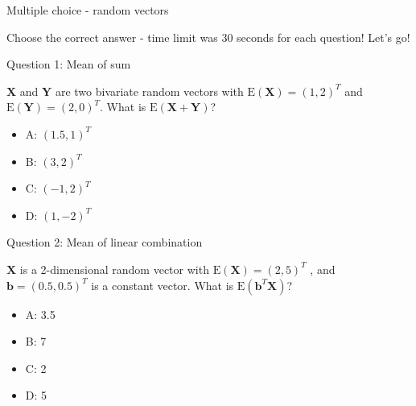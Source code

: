 \documentclass[ignorenonframetext,]{beamer}
\providecommand{\tightlist}{%
  \setlength{\itemsep}{0pt}\setlength{\parskip}{0pt}}
\begin{document}
\begin{frame}

\begin{block}{Multiple choice - random vectors}

\vspace{2mm}

Choose the correct answer - time limit was 30 seconds for each question!
Let's go!

\begin{block}{Question 1: Mean of sum}

\vspace{2mm}

\(\boldsymbol{X}\) and \(\boldsymbol{Y}\) are two bivariate random
vectors with \(\text{E}(\boldsymbol{X})=(1,2)^T\) and
\(\text{E}(\boldsymbol{Y})=(2,0)^T\). What is
\(\text{E}(\boldsymbol{X}+\boldsymbol{Y})\)?

\begin{itemize}
\tightlist
\item
  A: \((1.5,1)^T\)
\item
  B: \((3,2)^T\)
\item
  C: \((-1,2)^ T\)
\item
  D: \((1,-2)^T\)
\end{itemize}

\end{block}

\end{block}

\end{frame}

\begin{frame}

\begin{block}{Question 2: Mean of linear combination}

\vspace{2mm}

\(\boldsymbol{X}\) is a 2-dimensional random vector with
\(\text{E}(\boldsymbol{X})=(2,5)^T\) , and
\(\boldsymbol{b}=(0.5, 0.5)^T\) is a constant vector. What is
\(\text{E}(\boldsymbol{b}^T\boldsymbol{X})\)?

\begin{itemize}
\tightlist
\item
  A: 3.5
\item
  B: 7
\item
  C: 2
\item
  D: 5
\end{itemize}

\end{block}

\end{frame}
\end{document}
